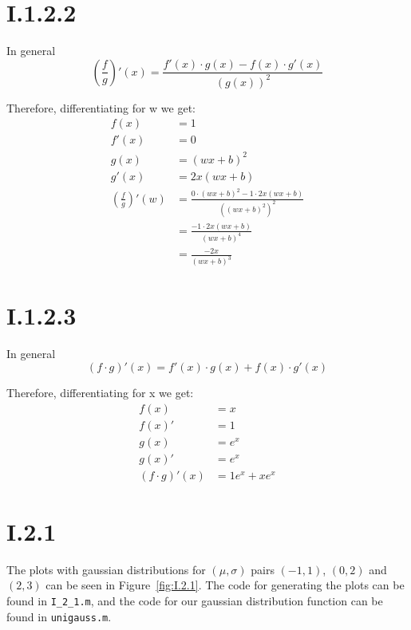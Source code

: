 \section*{I.1.2.2}
In general
\[
	\left ( \frac{f}{g} \right )' (x) = \frac{f'(x) \cdot g(x) - f(x) \cdot g'(x)}{(g(x))^2}
\]

Therefore, differentiating for w we get:
\begin{align*}
	f(x) &= 1 \\
	f'(x) &= 0 \\
	g(x) &= (wx+b)^2 \\
	g'(x) &= 2x(wx+b) \\
	\left ( \frac{f}{g} \right )' (w) &= \frac{0 \cdot (wx+b)^2 - 1 \cdot 2x(wx+b)}{((wx+b)^2)^2} \\
	&= \frac{-1 \cdot 2x(wx+b)}{(wx+b)^4} \\
	&= \frac{-2x}{(wx+b)^3}
\end{align*}

\section*{I.1.2.3}
In general
\[
	\left ( f \cdot g \right )' (x) = f'(x) \cdot g(x) + f(x) \cdot g'(x)
\]

Therefore, differentiating for x we get:
\begin{align*}
	f(x) &= x \\
	f(x)' &= 1 \\
	g(x) &= e^x \\
	g(x)' &= e^x \\
	\left ( f \cdot g \right )' (x) &= 1e^x + xe^x
\end{align*}

\pagebreak
\section*{I.2.1}
The plots with gaussian distributions for $(\mu,\sigma)$ pairs $(-1,1)$, $(0,2)$ and
$(2,3)$ can be seen in Figure~\ref{fig:I.2.1}. The code for generating the plots
can be found in \texttt{I\_2\_1.m}, and the code for our gaussian
distribution function can be found in \texttt{unigauss.m}.

